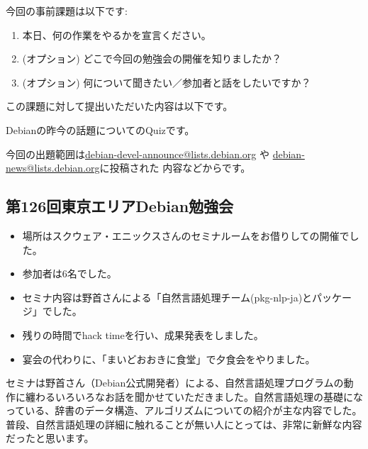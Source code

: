\documentclass[mingoth,a4paper]{jsarticle}
\begin{document}

今回の事前課題は以下です:
\begin{enumerate}
\item 本日、何の作業をやるかを宣言ください。
\item (オプション) どこで今回の勉強会の開催を知りましたか？
\item (オプション) 何について聞きたい／参加者と話をしたいですか？
\end{enumerate}
この課題に対して提出いただいた内容は以下です。
\begin{multicols}{2}
{\small

}
\end{multicols}


 Debianの昨今の話題についてのQuizです。

今回の出題範囲は\url{debian-devel-announce@lists.debian.org} や \url{debian-news@lists.debian.org}に投稿された
内容などからです。

\begin{multicols}{2}

\end{multicols}


\subsection{第126回東京エリアDebian勉強会}

\begin{itemize}
\item 場所はスクウェア・エニックスさんのセミナルームをお借りしての開催でした。
\item 参加者は6名でした。
\item セミナ内容は野首さんによる「自然言語処理チーム(pkg-nlp-ja)とパッケージ」でした。
\item 残りの時間でhack timeを行い、成果発表をしました。
\item 宴会の代わりに、「まいどおおきに食堂」で夕食会をやりました。  
\end{itemize} 

  セミナは野首さん（Debian公式開発者）による、自然言語処理プログラムの動作に纏わるいろいろなお話を聞かせていただきました。自然言語処理の基礎になっている、辞書のデータ構造、アルゴリズムについての紹介が主な内容でした。普段、自然言語処理の詳細に触れることが無い人にとっては、非常に新鮮な内容だったと思います。
  
\end{document}

